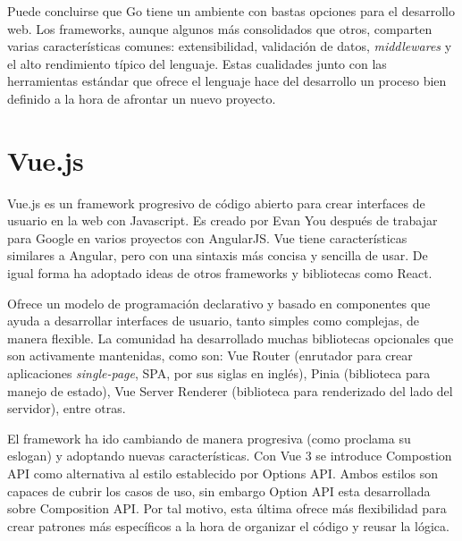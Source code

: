 Puede concluirse que Go tiene un ambiente con bastas opciones para el desarrollo web. Los frameworks, aunque algunos más consolidados que otros, comparten varias características comunes: extensibilidad, validación de datos, \textit{middlewares} y el alto rendimiento típico del lenguaje. Estas cualidades junto con las herramientas estándar que ofrece el lenguaje hace del desarrollo un proceso bien definido a la hora de afrontar un nuevo proyecto.

\section{Vue.js}

Vue.js es un framework progresivo de código abierto para crear interfaces de usuario en la web con Javascript. Es creado por Evan You después de trabajar para Google en varios proyectos con AngularJS. Vue tiene características similares a Angular, pero con una sintaxis más concisa y sencilla de usar. De igual forma ha adoptado ideas de otros frameworks y bibliotecas como React.

Ofrece un modelo de programación declarativo y basado en componentes que ayuda a desarrollar interfaces de usuario, tanto simples como complejas, de manera flexible. La comunidad ha desarrollado muchas bibliotecas opcionales que son activamente mantenidas, como son: Vue Router (enrutador para crear aplicaciones \textit{single-page}, SPA, por sus siglas en inglés), Pinia (biblioteca para manejo de estado), Vue Server Renderer (biblioteca para renderizado del lado del servidor), entre otras.

El framework ha ido cambiando de manera progresiva (como proclama su eslogan) y adoptando nuevas características. Con Vue 3 se introduce Compostion API como alternativa al estilo establecido por Options API. Ambos estilos son capaces de cubrir los casos de uso, sin embargo Option API esta desarrollada sobre Composition API. Por tal motivo, esta última ofrece más flexibilidad para crear patrones más específicos a la hora de organizar el código y reusar la lógica.

